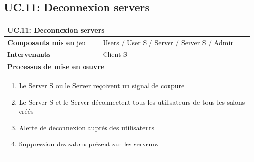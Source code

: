 \documentclass[a4paper,11pt,french]{article}
\begin{document}
\subsection{UC.11: Deconnexion servers}
\begin{center}
	\vspace*{0.7cm}
	\begin{tabularx}{16cm}{|l|X|}
	\hline
	\multicolumn{2}{|l|}{\textbf{UC.11: Deconnexion servers}}\\
	\hline
	\textbf{Composants mis en} jeu & Users / User S / Server / Server S / Admin \\
	\hline
	\textbf{Intervenants} & Client S \\
	\hline
	\multicolumn{2}{|l|}{\textbf{Processus de mise en \oe uvre}}\\
	\hline
	\multicolumn{2}{|p{15cm}|}{\begin{enumerate}\item Le Server S ou le Server re\c coivent un signal de coupure \item Le Server S et le Server déconnectent tous les utilisateurs de tous les salons créés \item Alerte de déconnexion auprès des utilisateurs \item Suppression des salons présent sur les serveurs \end{enumerate}}\\
	\hline
	\end{tabularx}
\end{center}

\end{document}
